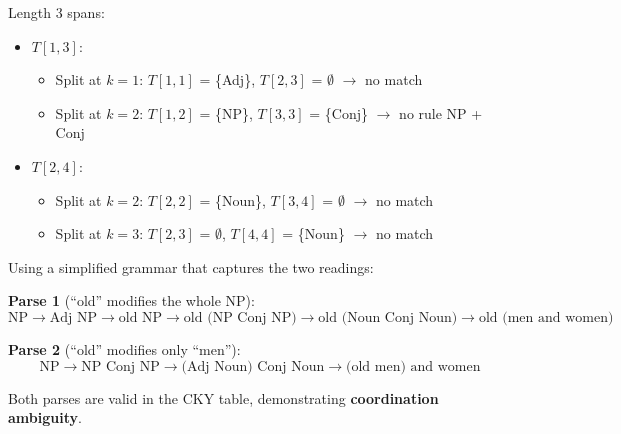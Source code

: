 \documentclass[11pt,a4paper]{article}
\begin{document}
\begin{tcolorbox}[colback=green!5!white,colframe=green!75!black,title=\textbf{Worked Example 32: CKY Parsing with Ambiguity}]
Length 3 spans:
\begin{itemize}
    \item $T[1,3]$: 
    \begin{itemize}
        \item Split at $k=1$: $T[1,1]$ = \{Adj\}, $T[2,3]$ = $\emptyset$ $\to$ no match
        \item Split at $k=2$: $T[1,2]$ = \{NP\}, $T[3,3]$ = \{Conj\} $\to$ no rule NP + Conj
    \end{itemize}
    \item $T[2,4]$:
    \begin{itemize}
        \item Split at $k=2$: $T[2,2]$ = \{Noun\}, $T[3,4]$ = $\emptyset$ $\to$ no match
        \item Split at $k=3$: $T[2,3]$ = $\emptyset$, $T[4,4]$ = \{Noun\} $\to$ no match
    \end{itemize}
\end{itemize}

Using a simplified grammar that captures the two readings:

\textbf{Parse 1} (``old'' modifies the whole NP):
\[
\text{NP} \to \text{Adj NP} \to \text{old NP} \to \text{old (NP Conj NP)} \to \text{old (Noun Conj Noun)} \to \text{old (men and women)}
\]

\textbf{Parse 2} (``old'' modifies only ``men''):
\[
\text{NP} \to \text{NP Conj NP} \to \text{(Adj Noun) Conj Noun} \to \text{(old men) and women}
\]

Both parses are valid in the CKY table, demonstrating \textbf{coordination ambiguity}.
\end{tcolorbox}
\end{document}

